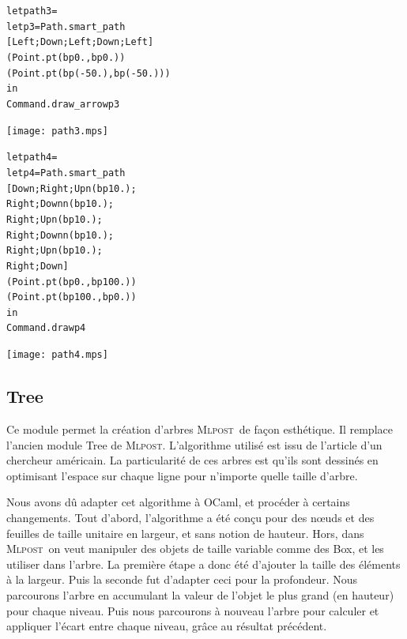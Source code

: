 \documentclass[a4paper,12pt]{article}
\newcommand{\mlpost}{\textsc{Mlpost}}
\begin{document}
\bigskip
\begin{minipage}{0.5\linewidth}
  \begin{alltt}
    let path3 = 
    let p3 = Path.smart_path 
    [Left;Down;Left;Down;Left] 
    (Point.pt (bp 0.,bp 0.)) 
    (Point.pt (bp (-50.),bp (-50.)))
    in
    Command.draw_arrow p3
  \end{alltt}
\end{minipage}
\begin{minipage}{0.5\linewidth}
\begin{center}
\texttt{[image: path3.mps]}
\end{center}
\end{minipage}

\bigskip
\begin{minipage}{0.5\linewidth}
  \begin{alltt}
    let path4 = 
    let p4 = Path.smart_path 
    [Down;Right;Upn (bp 10.);
      Right;Downn (bp 10.);
      Right;Upn (bp 10.);
      Right;Downn (bp 10.);
      Right;Upn (bp 10.);
      Right;Down]
    (Point.pt (bp 0.,bp 100.)) 
    (Point.pt (bp 100.,bp 0.))
    in
    Command.draw p4
  \end{alltt}
\end{minipage}
\begin{minipage}{0.5\linewidth}
\begin{center}
\texttt{[image: path4.mps]}
\end{center}
\end{minipage}


\subsection{Tree}
Ce module permet la création d'arbres \mlpost\ de façon esthétique.
Il remplace l'ancien module Tree de \mlpost. L'algorithme utilisé est issu de l'article d'un chercheur américain\cite{tree}.
La particularité de ces arbres est qu'ils sont dessinés en optimisant l'espace sur chaque ligne pour n'importe quelle taille d'arbre.
\bigskip 

Nous avons dû adapter cet algorithme à OCaml, et procéder à certains changements. Tout d'abord, l'algorithme a été conçu pour des n\oe uds et des feuilles de taille unitaire en largeur, et sans notion de hauteur. Hors, dans \mlpost\ on veut manipuler des objets de taille variable comme des Box, et les utiliser dans l'arbre. La première étape a donc été d'ajouter la taille des éléments à la largeur. Puis la seconde fut d'adapter ceci pour la profondeur. Nous parcourons l'arbre en accumulant la valeur de l'objet le plus grand (en hauteur) pour chaque niveau. Puis nous parcourons à nouveau l'arbre pour calculer et appliquer l'écart entre chaque niveau, grâce au résultat précédent.
\bigskip 
\end{document}
